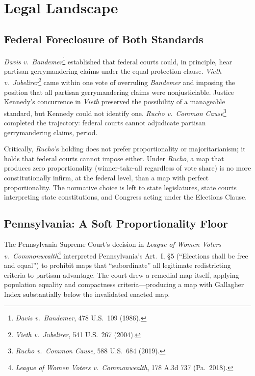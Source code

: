 \section{Legal Landscape}
\label{sec:legal}

\subsection{Federal Foreclosure of Both Standards}

\textit{Davis v.\ Bandemer}\footnote{\textit{Davis v.\ Bandemer}, 478 U.S.\ 109 (1986).}
established that federal courts could, in principle, hear partisan gerrymandering
claims under the equal protection clause. \textit{Vieth v.\ Jubelirer}\footnote{
\textit{Vieth v.\ Jubelirer}, 541 U.S.\ 267 (2004).} came within one vote of
overruling \textit{Bandemer} and imposing the position that all partisan gerrymandering
claims were nonjusticiable. Justice Kennedy's concurrence in \textit{Vieth} preserved
the possibility of a manageable standard, but Kennedy could not identify one.
\textit{Rucho v.\ Common Cause}\footnote{\textit{Rucho v.\ Common Cause}, 588 U.S.\
684 (2019).} completed the trajectory: federal courts cannot adjudicate partisan
gerrymandering claims, period.

Critically, \textit{Rucho}'s holding does not prefer proportionality or majoritarianism;
it holds that federal courts cannot impose either. Under \textit{Rucho}, a map
that produces zero proportionality (winner-take-all regardless of vote share) is
no more constitutionally infirm, at the federal level, than a map with perfect
proportionality. The normative choice is left to state legislatures, state courts
interpreting state constitutions, and Congress acting under the Elections Clause.

\subsection{Pennsylvania: A Soft Proportionality Floor}

The Pennsylvania Supreme Court's decision in \textit{League of Women Voters v.\
Commonwealth}\footnote{\textit{League of Women Voters v.\ Commonwealth}, 178 A.3d
737 (Pa.\ 2018).} interpreted Pennsylvania's Art.\ I, \S 5 (``Elections shall be
free and equal'') to prohibit maps that ``subordinate'' all legitimate redistricting
criteria to partisan advantage. The court drew a remedial map itself, applying
population equality and compactness criteria---producing a map with Gallagher Index
substantially below the invalidated enacted map.


